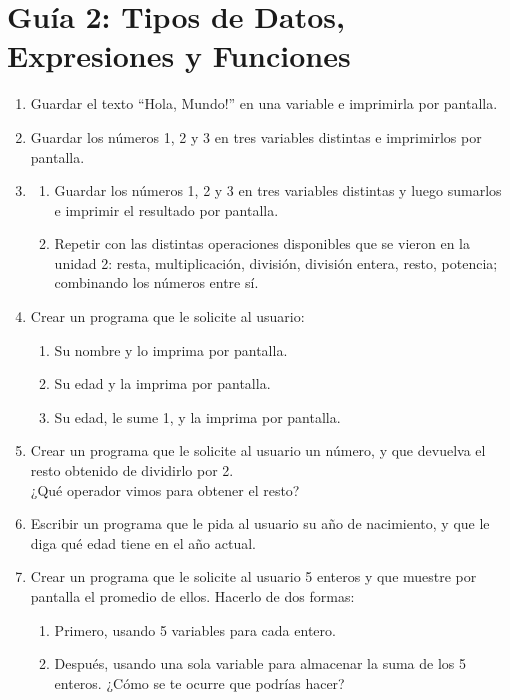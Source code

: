 \documentclass[
  letterpaper,
  DIV=11,
  numbers=noendperiod]{scrreprt}
\providecommand{\tightlist}{%
  \setlength{\itemsep}{0pt}\setlength{\parskip}{0pt}}\usepackage{longtable,booktabs,array}
\begin{document}
\section*{Guía 2: Tipos de Datos, Expresiones y
Funciones}\label{guuxeda-2-tipos-de-datos-expresiones-y-funciones}


\begin{enumerate}
\def\labelenumi{\arabic{enumi}.}
\item
  Guardar el texto ``Hola, Mundo!'' en una variable e imprimirla por
  pantalla.
\item
  Guardar los números 1, 2 y 3 en tres variables distintas e imprimirlos
  por pantalla.
\item
  \begin{enumerate}
  \def\labelenumii{\alph{enumii}.}
  \tightlist
  \item
    Guardar los números 1, 2 y 3 en tres variables distintas y luego
    sumarlos e imprimir el resultado por pantalla.\\
  \item
    Repetir con las distintas operaciones disponibles que se vieron en
    la unidad 2: resta, multiplicación, división, división entera,
    resto, potencia; combinando los números entre sí.
  \end{enumerate}
\item
  Crear un programa que le solicite al usuario:

  \begin{enumerate}
  \def\labelenumii{\alph{enumii}.}
  \tightlist
  \item
    Su nombre y lo imprima por pantalla.
  \item
    Su edad y la imprima por pantalla.
  \item
    Su edad, le sume 1, y la imprima por pantalla.
  \end{enumerate}
\item
  Crear un programa que le solicite al usuario un número, y que devuelva
  el resto obtenido de dividirlo por 2.\\
  ¿Qué operador vimos para obtener el resto?
\item
  Escribir un programa que le pida al usuario su año de nacimiento, y
  que le diga qué edad tiene en el año actual.
\item
  Crear un programa que le solicite al usuario 5 enteros y que muestre
  por pantalla el promedio de ellos. Hacerlo de dos formas:

  \begin{enumerate}
  \def\labelenumii{\alph{enumii}.}
  \tightlist
  \item
    Primero, usando 5 variables para cada entero.
  \item
    Después, usando una sola variable para almacenar la suma de los 5
    enteros. ¿Cómo se te ocurre que podrías hacer?
  \end{enumerate}
\end{enumerate}
\end{document}
